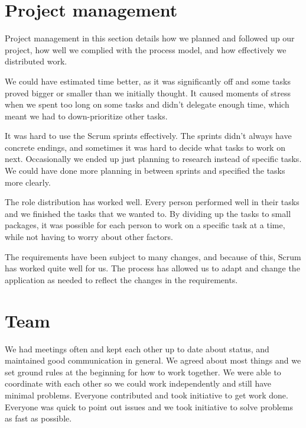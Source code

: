 \section{Project management}

Project management in this section details how we planned and followed up our project, how well we complied with the process model, and how effectively we distributed work.\newline

We could have estimated time better, as it was significantly off and some tasks proved bigger or smaller than we initially thought. It caused moments of stress when we spent too long on some tasks and didn't delegate enough time, which meant we had to down-prioritize other tasks.\newline

It was hard to use the Scrum sprints effectively. The sprints didn't always have concrete endings, and sometimes it was hard to decide what tasks to work on next. Occasionally we ended up just planning to research instead of specific tasks. We could have done more planning in between sprints and specified the tasks more clearly.\newline

The role distribution has worked well. Every person performed well in their tasks and we finished the tasks that we wanted to. By dividing up the tasks to small packages, it was possible for each person to work on a specific task at a time, while not having to worry about other factors.\newline

The requirements have been subject to many changes, and because of this, Scrum has worked quite well for us. The process has allowed us to adapt and change the application as needed to reflect the changes in the requirements.

\section{Team}

We had meetings often and kept each other up to date about status, and maintained good communication in general. We agreed about most things and we set ground rules at the beginning for how to work together. We were able to coordinate with each other so we could work independently and still have minimal problems. Everyone contributed and took initiative to get work done. Everyone was quick to point out issues and we took initiative to solve problems as fast as possible.\newline

